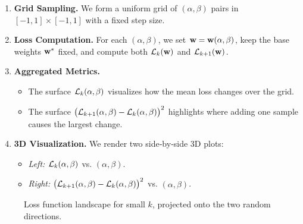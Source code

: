 \documentclass{article}
\begin{document}
\begin{enumerate}
  \item \textbf{Grid Sampling.}
        We form a uniform grid of $(\alpha, \beta)$ pairs in $[-1,1]\times[-1,1]$ with a fixed step size.
  \item \textbf{Loss Computation.}
        For each $(\alpha,\beta)$, we set $\mathbf{w}=\mathbf{w}(\alpha,\beta)$, keep the base weights $\mathbf{w}^*$ fixed, and compute both
        $\mathcal{L}_k(\mathbf{w})$ and $\mathcal{L}_{k+1}(\mathbf{w})$.
  \item \textbf{Aggregated Metrics.}
        \begin{itemize}
          \item The surface $\mathcal{L}_k(\alpha,\beta)$ visualizes how the mean loss changes over the grid.
          \item The surface $\bigl( \mathcal{L}_{k+1} (\alpha, \beta) - \mathcal{L}_k (\alpha, \beta) \bigr)^2$ highlights where adding one sample
                causes the largest change.
        \end{itemize}
  \item \textbf{3D Visualization.}
        We render two side‐by‐side 3D plots:
        \begin{itemize}
          \item \emph{Left:} $\mathcal{L}_k (\alpha, \beta)$ vs. $(\alpha, \beta)$.
          \item \emph{Right:} $\bigl( \mathcal{L}_{k+1} (\alpha, \beta) - \mathcal{L}_k (\alpha, \beta) \bigr)^2$ vs. $(\alpha, \beta)$.
        \end{itemize}
\end{enumerate}

\begin{figure}[!htbp]
  \hspace*{-2.2cm}
  \caption{Loss function landscape for small $k$, projected onto the two random directions.}
  \label{fig:loss_random_small}
\end{figure}
\end{document}
